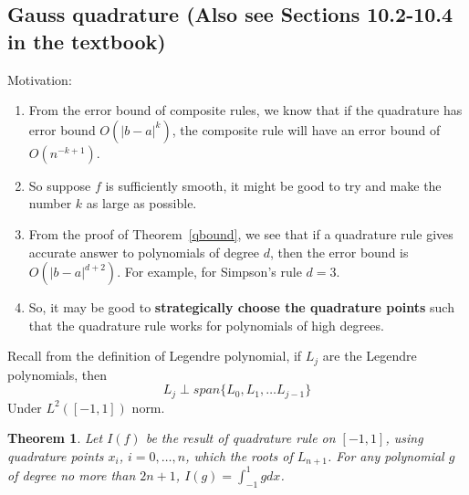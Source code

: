 \documentclass[20pt]{article} %
\theoremstyle{break}
\newtheorem{thm}[definition]{Theorem}
\begin{document}
  \subsection{Gauss quadrature (Also see Sections 10.2-10.4 in the textbook)}
  Motivation:
  \begin{enumerate}
  \item From the error bound of composite rules, we know that if the quadrature has error bound $O(|b-a|^k)$, the composite rule will have an error bound of $O(n^{-k+1})$.
  \item So suppose $f$ is sufficiently smooth, it might be good to try and make the number $k$ as large as possible.
  \item From the proof of Theorem~\ref{qbound}, we see that if a quadrature rule gives accurate answer to polynomials of degree $d$, then the error bound is $O(|b-a|^{d+2})$. For example, for Simpson's rule $d=3$. 
  \item So, it may be good to {\bf strategically choose the quadrature points} such that the quadrature rule works for polynomials of high degrees. 
  \end{enumerate}

  Recall from the definition of Legendre polynomial, if $L_j$ are the Legendre polynomials, then
  \[L_j\perp span\{L_0, L_1, \dots L_{j-1}\}\]
  Under $L^2([-1, 1])$ norm.

  \newpage

  \begin{thm}\label{high_poly} Let $I(f)$ be the result of quadrature rule on $[-1, 1]$, using quadrature points  $x_i$, $i=0, \dots, n$, which the roots of $L_{n+1}$. For any polynomial $g$ of degree no more than $2n+1$, $I(g)=\int_{-1}^1gdx$.\end{thm}
\end{document}
